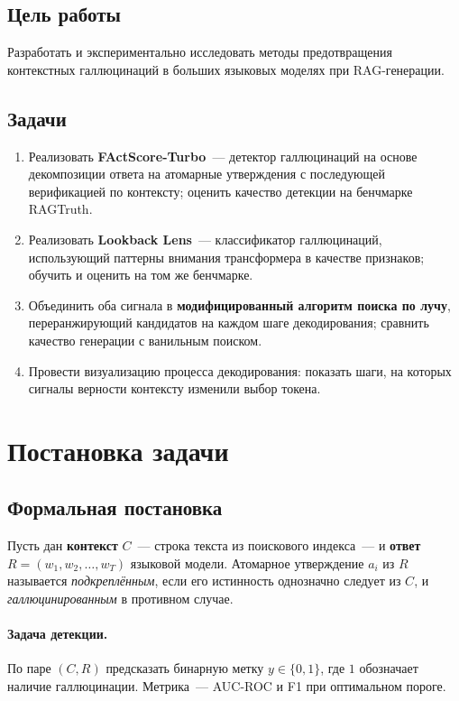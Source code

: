 \documentclass[a4paper,12pt]{extarticle}
\begin{document}
\subsection*{Цель работы}
Разработать и экспериментально исследовать методы предотвращения контекстных
галлюцинаций в больших языковых моделях при RAG-генерации.

\subsection*{Задачи}
\begin{enumerate}[leftmargin=1.8em]
  \item Реализовать \textbf{FActScore-Turbo}~--- детектор галлюцинаций на основе
        декомпозиции ответа на атомарные утверждения с последующей верификацией
        по контексту; оценить качество детекции на бенчмарке RAGTruth.
  \item Реализовать \textbf{Lookback Lens}~--- классификатор галлюцинаций,
        использующий паттерны внимания трансформера в качестве признаков;
        обучить и оценить на том же бенчмарке.
  \item Объединить оба сигнала в \textbf{модифицированный алгоритм поиска по лучу},
        переранжирующий кандидатов на каждом шаге декодирования;
        сравнить качество генерации с ванильным поиском.
  \item Провести визуализацию процесса декодирования: показать шаги,
        на которых сигналы верности контексту изменили выбор токена.
\end{enumerate}

\section{Постановка задачи}
\label{sec:problem}

\subsection{Формальная постановка}

Пусть дан \textbf{контекст} $C$~--- строка текста из поискового индекса~--- и
\textbf{ответ} $R = (w_1, w_2, \ldots, w_T)$ языковой модели.
Атомарное утверждение $a_i$ из $R$ называется \textit{подкреплённым}, если
его истинность однозначно следует из $C$, и \textit{галлюцинированным} в
противном случае.

\paragraph{Задача детекции.}
По паре $(C, R)$ предсказать бинарную метку $y \in \{0, 1\}$,
где $1$ обозначает наличие галлюцинации. Метрика~--- AUC-ROC и F1 при
оптимальном пороге.
\end{document}
